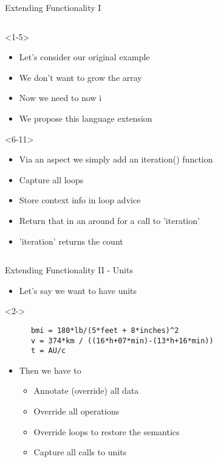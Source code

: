 \begin{frame}[fragile,t]{Extending Functionality I}
\begin{columns}[T]
      \begin{column}{5cm}
        \begin{onlyenv}<1-5>
          \begin{itemize}
          \item<1-5> Let's consider our original example
          \item<2-5> We don't want to grow the array
          \item<4-5> Now we need to now i
          \item<5> We propose this language extension 
          \end{itemize}
        \end{onlyenv}
        \begin{onlyenv}<6-11>
          \begin{itemize}
          \item<6-> Via an aspect we simply add an iteration() function
          \item<7-> Capture all loops
          \item<8-> Store context info in loop advice 
           \item<9-> Return that in an around for a call to 'iteration'
          \item<10> 'iteration' returns the count
          \end{itemize}
        \end{onlyenv}
    \end{column}
  \end{columns}
\end{frame}




\begin{frame}[fragile,t]{Extending Functionality II - Units}
  \begin{itemize}
  \item Let's say we want to have units
  \end{itemize}
  \begin{onlyenv}<2->
    \begin{Verbatim}
      bmi = 180*lb/(5*feet + 8*inches)^2
      v = 374*km / ((16*h+07*min)-(13*h+16*min))
      t = AU/c
    \end{Verbatim}
  \end{onlyenv}
  \begin{itemize}
    \pause
    \pause \item Then we have to
    \begin{itemize}
      \pause \item Annotate (override) all data
      \pause \item Override all operations
      \pause \item Override loops to restore the semantics
      \pause \item Capture all calls to units
    \end{itemize}
  \end{itemize}
\end{frame}


